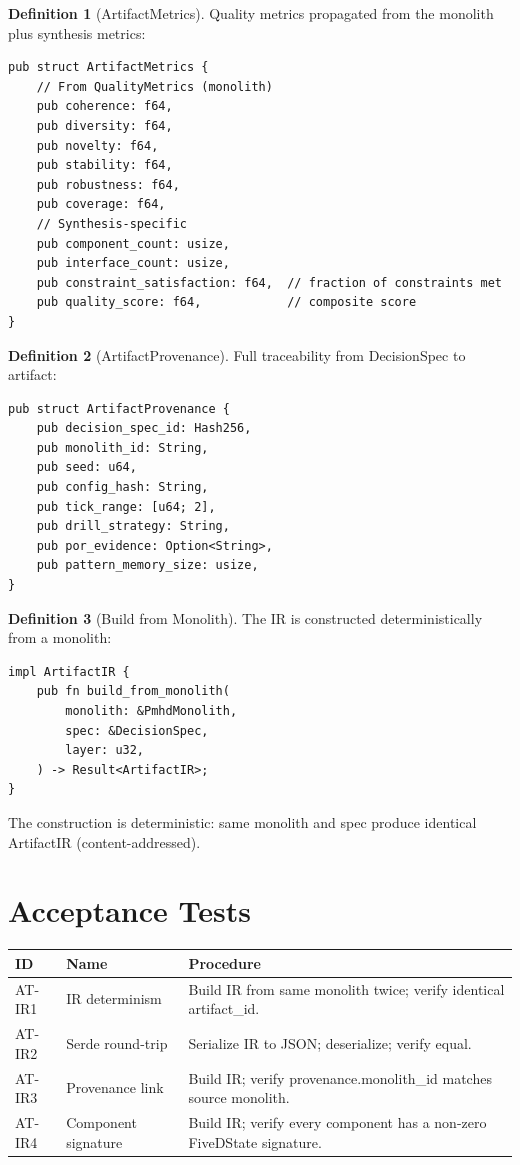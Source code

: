 \documentclass[11pt,a4paper,twoside]{article}
\theoremstyle{definition}
\newtheorem{definition}{Definition}[section]
\theoremstyle{plain}
\theoremstyle{remark}
\begin{document}
\begin{definition}[ArtifactMetrics]\label{def:artmetrics}
Quality metrics propagated from the monolith plus synthesis metrics:
\begin{lstlisting}
pub struct ArtifactMetrics {
    // From QualityMetrics (monolith)
    pub coherence: f64,
    pub diversity: f64,
    pub novelty: f64,
    pub stability: f64,
    pub robustness: f64,
    pub coverage: f64,
    // Synthesis-specific
    pub component_count: usize,
    pub interface_count: usize,
    pub constraint_satisfaction: f64,  // fraction of constraints met
    pub quality_score: f64,            // composite score
}
\end{lstlisting}
\end{definition}

\begin{definition}[ArtifactProvenance]\label{def:artprov}
Full traceability from DecisionSpec to artifact:
\begin{lstlisting}
pub struct ArtifactProvenance {
    pub decision_spec_id: Hash256,
    pub monolith_id: String,
    pub seed: u64,
    pub config_hash: String,
    pub tick_range: [u64; 2],
    pub drill_strategy: String,
    pub por_evidence: Option<String>,
    pub pattern_memory_size: usize,
}
\end{lstlisting}
\end{definition}

\begin{definition}[Build from Monolith]\label{def:buildir}
The IR is constructed deterministically from a monolith:
\begin{lstlisting}
impl ArtifactIR {
    pub fn build_from_monolith(
        monolith: &PmhdMonolith,
        spec: &DecisionSpec,
        layer: u32,
    ) -> Result<ArtifactIR>;
}
\end{lstlisting}
The construction is deterministic: same monolith and spec produce
identical ArtifactIR (content-addressed).
\end{definition}


\section{Acceptance Tests}\label{sec:ir:tests}

\begin{longtable}{l l p{6.5cm}}
\toprule
\textbf{ID} & \textbf{Name} & \textbf{Procedure} \\
\midrule
\endfirsthead \midrule \endhead \bottomrule \endfoot
AT-IR1 & IR determinism & Build IR from same monolith twice; verify
  identical artifact\_id. \\
AT-IR2 & Serde round-trip & Serialize IR to JSON; deserialize; verify
  equal. \\
AT-IR3 & Provenance link & Build IR; verify provenance.monolith\_id
  matches source monolith. \\
AT-IR4 & Component signature & Build IR; verify every component has a
  non-zero FiveDState signature. \\
\end{longtable}
\end{document}
